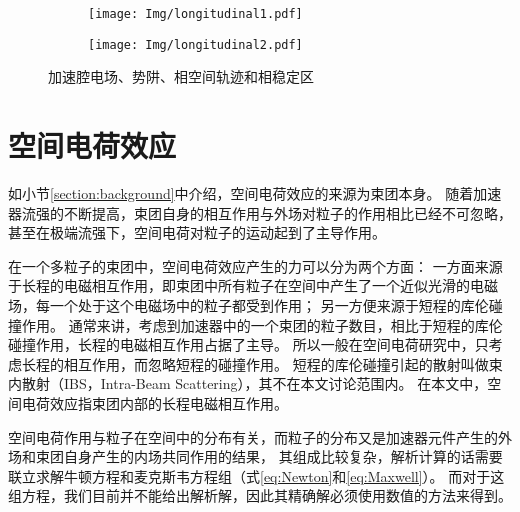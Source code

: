 \begin{figure}[!htb]
    \centering
    \begin{subfigure}[b]{0.48\textwidth}
        \texttt{[image: Img/longitudinal1.pdf]}
    \end{subfigure}
    \begin{subfigure}[b]{0.45\textwidth}
        \texttt{[image: Img/longitudinal2.pdf]}
    \end{subfigure}
    \caption{加速腔电场、势阱、相空间轨迹和相稳定区}
    \label{fig:longitudinal1}
\end{figure}


\section{空间电荷效应}
如小节\ref{section:background}中介绍，空间电荷效应的来源为束团本身。
随着加速器流强的不断提高，束团自身的相互作用与外场对粒子的作用相比已经不可忽略，
甚至在极端流强下，空间电荷对粒子的运动起到了主导作用。

在一个多粒子的束团中，空间电荷效应产生的力可以分为两个方面：
一方面来源于长程的电磁相互作用，即束团中所有粒子在空间中产生了一个近似光滑的电磁场，每一个处于这个电磁场中的粒子都受到作用；
另一方便来源于短程的库伦碰撞作用。
通常来讲，考虑到加速器中的一个束团的粒子数目，相比于短程的库伦碰撞作用，长程的电磁相互作用占据了主导。
所以一般在空间电荷研究中，只考虑长程的相互作用，而忽略短程的碰撞作用。
短程的库伦碰撞引起的散射叫做束内散射（IBS，Intra-Beam Scattering），其不在本文讨论范围内。
在本文中，空间电荷效应指束团内部的长程电磁相互作用。

空间电荷作用与粒子在空间中的分布有关，而粒子的分布又是加速器元件产生的外场和束团自身产生的内场共同作用的结果，
其组成比较复杂，解析计算的话需要联立求解牛顿方程和麦克斯韦方程组（式\ref{eq:Newton}和\ref{eq:Maxwell}）。
而对于这组方程，我们目前并不能给出解析解，因此其精确解必须使用数值的方法来得到。

